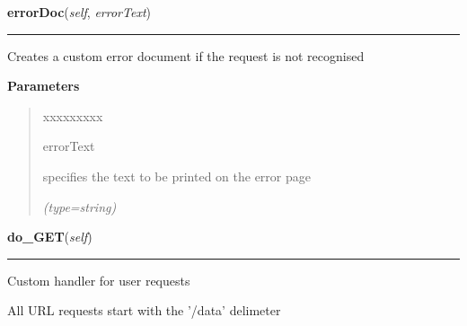     \label{HttpServer:Handler:errorDoc}

    \vspace{0.5ex}

\hspace{.8\funcindent}\begin{boxedminipage}{\funcwidth}

    \raggedright \textbf{errorDoc}(\textit{self}, \textit{errorText})

    \vspace{-1.5ex}

    \rule{\textwidth}{0.5\fboxrule}
\setlength{\parskip}{2ex}
    Creates a custom error document if the request is not recognised

\setlength{\parskip}{1ex}
      \textbf{Parameters}
      \vspace{-1ex}

      \begin{quote}
        \begin{Ventry}{xxxxxxxxx}

          \item[errorText]

          specifies the text to be printed on the error page

            {\it (type=string)}

        \end{Ventry}

      \end{quote}

    \end{boxedminipage}

    \label{HttpServer:Handler:do_GET}

    \vspace{0.5ex}

\hspace{.8\funcindent}\begin{boxedminipage}{\funcwidth}

    \raggedright \textbf{do\_GET}(\textit{self})

    \vspace{-1.5ex}

    \rule{\textwidth}{0.5\fboxrule}
\setlength{\parskip}{2ex}
    Custom handler for user requests

    All URL requests start with the '/data' delimeter

\setlength{\parskip}{1ex}
    \end{boxedminipage}

